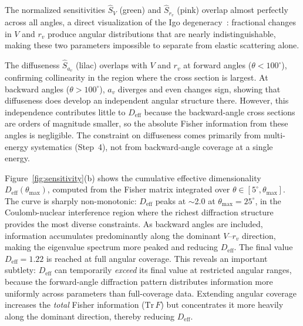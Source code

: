 \documentclass[aps,prl,reprint,superscriptaddress,showpacs]{revtex4-2}
\begin{document}
The normalized sensitivities $\hat{S}_V$ (green) and $\hat{S}_{r_v}$ (pink) overlap almost perfectly across all angles, a direct visualization of the Igo degeneracy~\cite{Igo1958}: fractional changes in $V$ and $r_v$ produce angular distributions that are nearly indistinguishable, making these two parameters impossible to separate from elastic scattering alone.

The diffuseness $\hat{S}_{a_v}$ (lilac) overlaps with $V$ and $r_v$ at forward angles ($\theta < 100^\circ$), confirming collinearity in the region where the cross section is largest. At backward angles ($\theta > 100^\circ$), $a_v$ diverges and even changes sign, showing that diffuseness does develop an independent angular structure there. However, this independence contributes little to $D_\mathrm{eff}$ because the backward-angle cross sections are orders of magnitude smaller, so the absolute Fisher information from these angles is negligible. The constraint on diffuseness comes primarily from multi-energy systematics (Step~4), not from backward-angle coverage at a single energy.

Figure~\ref{fig:sensitivity}(b) shows the cumulative effective dimensionality $D_\mathrm{eff}(\theta_\mathrm{max})$, computed from the Fisher matrix integrated over $\theta \in [5^\circ, \theta_\mathrm{max}]$. The curve is sharply non-monotonic: $D_\mathrm{eff}$ peaks at $\sim$2.0 at $\theta_\mathrm{max} = 25^\circ$, in the Coulomb-nuclear interference region where the richest diffraction structure provides the most diverse constraints. As backward angles are included, information accumulates predominantly along the dominant $V$--$r_v$ direction, making the eigenvalue spectrum more peaked and reducing $D_\mathrm{eff}$. The final value $D_\mathrm{eff} = 1.22$ is reached at full angular coverage. This reveals an important subtlety: $D_\mathrm{eff}$ can temporarily \emph{exceed} its final value at restricted angular ranges, because the forward-angle diffraction pattern distributes information more uniformly across parameters than full-coverage data. Extending angular coverage increases the \emph{total} Fisher information ($\mathrm{Tr}\,F$) but concentrates it more heavily along the dominant direction, thereby reducing $D_\mathrm{eff}$.
\end{document}
